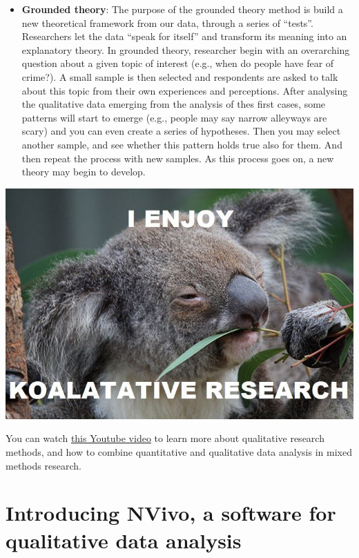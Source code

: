 \documentclass[
]{book}
\begin{document}
\begin{itemize}
\item
  \textbf{Grounded theory}: The purpose of the grounded theory method is build a new theoretical framework from our data, through a series of ``tests''. Researchers let the data ``speak for itself'' and transform its meaning into an explanatory theory. In grounded theory, researcher begin with an overarching question about a given topic of interest (e.g., when do people have fear of crime?). A small sample is then selected and respondents are asked to talk about this topic from their own experiences and perceptions. After analysing the qualitative data emerging from the analysis of thes first cases, some patterns will start to emerge (e.g., people may say narrow alleyways are scary) and you can even create a series of hypotheses. Then you may select another sample, and see whether this pattern holds true also for them. And then repeat the process with new samples. As this process goes on, a new theory may begin to develop.
\end{itemize}

\includegraphics{imgs/koala.jpg}

You can watch \href{https://www.youtube.com/watch?v=hECPeKv5tPM}{this Youtube video} to learn more about qualitative research methods, and how to combine quantitative and qualitative data analysis in mixed methods research.

\hypertarget{introducing-nvivo-a-software-for-qualitative-data-analysis}{%
\section{Introducing NVivo, a software for qualitative data analysis}\label{introducing-nvivo-a-software-for-qualitative-data-analysis}}
\end{document}
